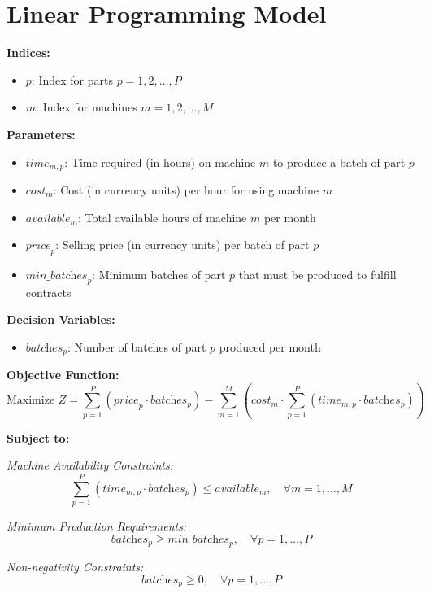 \documentclass{article}
\begin{document}
\section*{Linear Programming Model}

\textbf{Indices:}
\begin{itemize}
    \item \( p \): Index for parts \( p = 1, 2, \ldots, P \)
    \item \( m \): Index for machines \( m = 1, 2, \ldots, M \)
\end{itemize}

\textbf{Parameters:}
\begin{itemize}
    \item \( \textit{time}_{m,p} \): Time required (in hours) on machine \( m \) to produce a batch of part \( p \)
    \item \( \textit{cost}_{m} \): Cost (in currency units) per hour for using machine \( m \)
    \item \( \textit{available}_{m} \): Total available hours of machine \( m \) per month
    \item \( \textit{price}_{p} \): Selling price (in currency units) per batch of part \( p \)
    \item \( \textit{min\_batches}_{p} \): Minimum batches of part \( p \) that must be produced to fulfill contracts
\end{itemize}

\textbf{Decision Variables:}
\begin{itemize}
    \item \( \textit{batches}_{p} \): Number of batches of part \( p \) produced per month
\end{itemize}

\textbf{Objective Function:}
\[
\text{Maximize } Z = \sum_{p=1}^{P} \left( \textit{price}_{p} \cdot \textit{batches}_{p} \right) - \sum_{m=1}^{M} \left( \textit{cost}_{m} \cdot \sum_{p=1}^{P} \left( \textit{time}_{m,p} \cdot \textit{batches}_{p} \right) \right)
\]

\textbf{Subject to:}

\textit{Machine Availability Constraints:}
\[
\sum_{p=1}^{P} \left( \textit{time}_{m,p} \cdot \textit{batches}_{p} \right) \leq \textit{available}_{m}, \quad \forall m = 1, \ldots, M
\]

\textit{Minimum Production Requirements:}
\[
\textit{batches}_{p} \geq \textit{min\_batches}_{p}, \quad \forall p = 1, \ldots, P
\]

\textit{Non-negativity Constraints:}
\[
\textit{batches}_{p} \geq 0, \quad \forall p = 1, \ldots, P
\]
\end{document}
